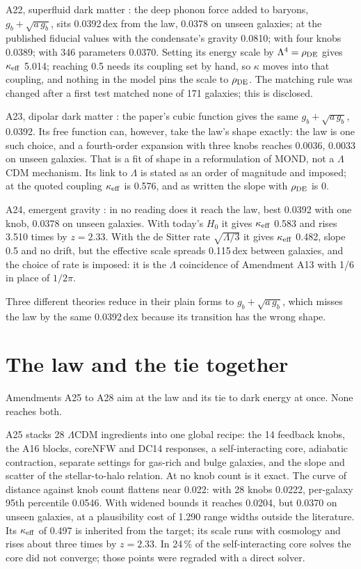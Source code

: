 \documentclass[11pt]{article}
\begin{document}
A22, superfluid dark matter \cite{berezhiani15}: the deep phonon force added to baryons, $g_b+\sqrt{a\,g_b}$, sits 0.0392\,dex from the law, 0.0378 on unseen galaxies; at the published fiducial values with the condensate's gravity 0.0810; with four knobs 0.0389; with 346 parameters 0.0370. Setting its energy scale by $\Lambda^4=\rho_{\rm DE}$ gives $\kappa_{\rm eff}$ 5.014; reaching 0.5 needs its coupling set by hand, so $\kappa$ moves into that coupling, and nothing in the model pins the scale to $\rho_{\rm DE}$. The matching rule was changed after a first test matched none of 171 galaxies; this is disclosed.

A23, dipolar dark matter \cite{blanchet08}: the paper's cubic function gives the same $g_b+\sqrt{a\,g_b}$, 0.0392. Its free function can, however, take the law's shape exactly: the law is one such choice, and a fourth-order expansion with three knobs reaches 0.0036, 0.0033 on unseen galaxies. That is a fit of shape in a reformulation of MOND, not a $\Lambda$CDM mechanism. Its link to $\Lambda$ is stated as an order of magnitude and imposed; at the quoted coupling $\kappa_{\rm eff}$ is 0.576, and as written the slope with $\rho_{\rm DE}$ is 0.

A24, emergent gravity \cite{verlinde17}: in no reading does it reach the law, best 0.0392 with one knob, 0.0378 on unseen galaxies. With today's $H_0$ it gives $\kappa_{\rm eff}$ 0.583 and rises 3.510 times by $z=2.33$. With the de Sitter rate $\sqrt{\Lambda/3}$ it gives $\kappa_{\rm eff}$ 0.482, slope 0.5 and no drift, but the effective scale spreads 0.115\,dex between galaxies, and the choice of rate is imposed: it is the $\Lambda$ coincidence of Amendment A13 with 1/6 in place of $1/2\pi$.

Three different theories reduce in their plain forms to $g_b+\sqrt{a\,g_b}$, which misses the law by the same 0.0392\,dex because its transition has the wrong shape.

\section{The law and the tie together}
Amendments A25 to A28 aim at the law and its tie to dark energy at once. None reaches both.

A25 stacks 28 $\Lambda$CDM ingredients into one global recipe: the 14 feedback knobs, the A16 blocks, coreNFW and DC14 responses, a self-interacting core, adiabatic contraction, separate settings for gas-rich and bulge galaxies, and the slope and scatter of the stellar-to-halo relation. At no knob count is it exact. The curve of distance against knob count flattens near 0.022: with 28 knobs 0.0222, per-galaxy 95th percentile 0.0546. With widened bounds it reaches 0.0204, but 0.0370 on unseen galaxies, at a plausibility cost of 1.290 range widths outside the literature. Its $\kappa_{\rm eff}$ of 0.497 is inherited from the target; its scale runs with cosmology and rises about three times by $z=2.33$. In 24\,\% of the self-interacting core solves the core did not converge; those points were regraded with a direct solver.
\end{document}
